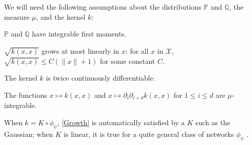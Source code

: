 \documentclass{article}
\newcommand{\PP}{\mathbb P}
\newcommand{\QQ}{\mathbb Q}
\newcommand{\x}{\mathcal X}
\let\citep\parencite
\begin{document}
We will need the following assumptions about the distributions $\PP$ and $\QQ$,
the measure $\mu$,
and the kernel $k$:
\begin{assumplist}
  \item \label{Moments} $\PP$ and $\QQ$ have integrable first moments.
  \item \label{Growth} $\sqrt{k(x, x)}$ grows at most linearly in $x$: for all $x$ in $\x$, $\sqrt{k(x, x)} \leq C (\lVert x \rVert + 1)$ for some constant $C$.
  \item \label{Differentiability} The kernel $k$ is twice continuously differentiable.
  \item \label{Integrability} The functions $x \mapsto k(x, x)$ and $x \mapsto \partial_i \partial_{i+d} k(x, x)$ for $1\leq i\leq d$ are $\mu$-integrable.
\end{assumplist}
When $k = K \circ \phi_\psi$, \cref{Growth} is automatically satisfied by a $K$ such as the Gaussian;
when $K$ is linear, it is true for a quite general class of networks $\phi_\psi$ \citep[Lemma 1]{Binkowski:2018}.
\end{document}
